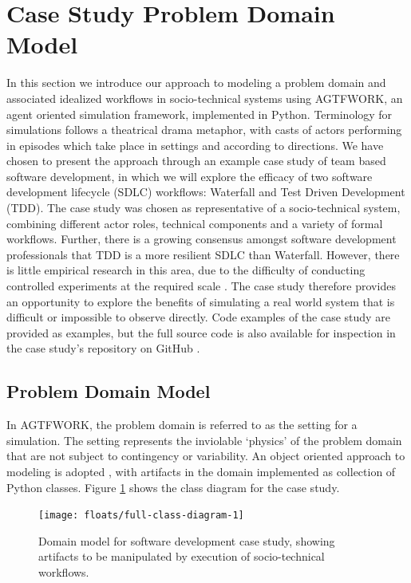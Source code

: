 \documentclass{llncs}
\begin{document}
\section{Case Study Problem Domain Model}

In this section we introduce our approach to modeling a problem domain and associated idealized workflows in
socio-technical systems using AGTFWORK, an agent oriented simulation framework, implemented in Python.  Terminology for
simulations follows a theatrical drama metaphor, with casts of actors performing in episodes which take place in
settings and according to directions. We have chosen to present the approach through an example case study of team based
software development, in which we will explore the efficacy of two software development lifecycle (SDLC) workflows:
Waterfall and Test Driven Development (TDD).  The case study was chosen as representative of a socio-technical system,
combining different actor roles, technical components and a variety of formal workflows.  Further, there is a growing
consensus amongst software development professionals that TDD is a more resilient SDLC than Waterfall. However, there is
little empirical research in this area, due to the difficulty of conducting controlled experiments at the required scale
\cite{George2004TestDrivenDevelopment}. The case study therefore provides an opportunity to explore the benefits of
simulating a real world system that is difficult or impossible to observe directly. Code examples of the case study are
provided as examples, but the full source code is also available for inspection in the case study’s repository on GitHub
\cite{ANON}.

\subsection{Problem Domain Model}

In AGTFWORK, the problem domain is referred to as the setting for a simulation.  The setting represents the inviolable
‘physics’ of the problem domain that are not subject to contingency or variability. An object oriented approach to
modeling is adopted \cite{bennett06object}, with artifacts in the domain implemented as collection of Python classes.
Figure \ref{fig:domain} shows the class diagram for the case study.

\begin{figure}
  \centering
  \texttt{[image: floats/full-class-diagram-1]}
  \caption{Domain model for software development case study, showing artifacts to be manipulated by execution of
    socio-technical workflows.}
  \label{fig:domain}
\end{figure}
\end{document}
